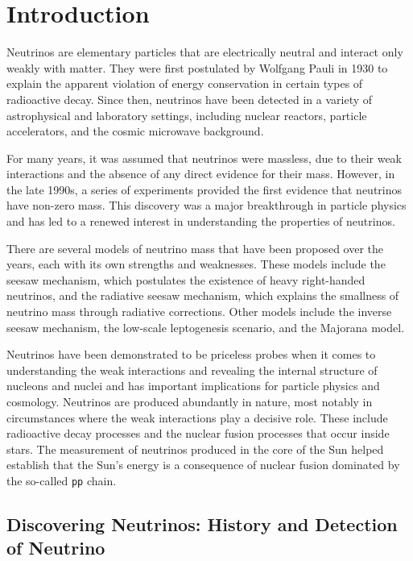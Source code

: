 
\section{\label{sec:intro}Introduction}


Neutrinos are elementary particles that are electrically neutral and interact only weakly with matter. They were first postulated by Wolfgang Pauli in 1930 to explain the apparent violation of energy conservation in certain types of radioactive decay. Since then, neutrinos have been detected in a variety of astrophysical and laboratory settings, including nuclear reactors, particle accelerators, and the cosmic microwave background.

For many years, it was assumed that neutrinos were massless, due to their weak interactions and the absence of any direct evidence for their mass. However, in the late 1990s, a series of experiments provided the first evidence that neutrinos have non-zero mass. This discovery was a major breakthrough in particle physics and has led to a renewed interest in understanding the properties of neutrinos.

There are several models of neutrino mass that have been proposed over the years, each with its own strengths and weaknesses. These models include the seesaw mechanism, which postulates the existence of heavy right-handed neutrinos, and the radiative seesaw mechanism, which explains the smallness of neutrino mass through radiative corrections. Other models include the inverse seesaw mechanism, the low-scale leptogenesis scenario, and the Majorana model.

Neutrinos have been demonstrated to be priceless probes when it comes to understanding the weak interactions and revealing the internal structure of nucleons and nuclei and has important implications for particle physics and cosmology. Neutrinos are produced abundantly in nature, most notably in circumstances where the weak interactions play a decisive role. These include radioactive decay processes and the nuclear fusion processes that occur inside stars. The measurement of neutrinos produced in the core of the Sun helped establish that the Sun’s energy is a consequence of nuclear fusion dominated by the so-called \texttt{pp} chain.

\subsection{\label{subsec:history_of_nu}Discovering Neutrinos: History and Detection of Neutrino}

